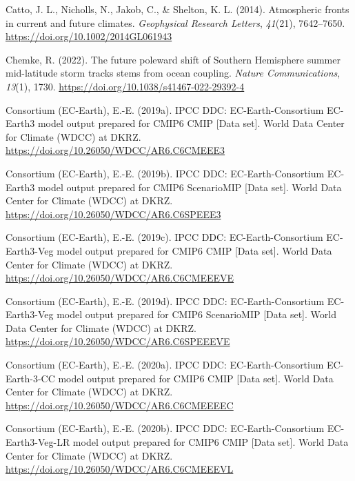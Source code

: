 \documentclass[
]{agujournal2019}
\newlength{\cslhangindent}
\newenvironment{CSLReferences}[2] %
 {\begin{list}{}{%
  \setlength{\itemindent}{0pt}
  \setlength{\leftmargin}{0pt}
  \setlength{\parsep}{0pt}
  \ifodd #1
   \setlength{\leftmargin}{\cslhangindent}
   \setlength{\itemindent}{-1\cslhangindent}
  \fi
  \setlength{\itemsep}{#2\baselineskip}}}
 {\end{list}}
\begin{document}
\begin{CSLReferences}{1}{0}
Catto, J. L., Nicholls, N., Jakob, C., \& Shelton, K. L. (2014).
Atmospheric fronts in current and future climates. \emph{Geophysical
Research Letters}, \emph{41}(21), 7642--7650.
\url{https://doi.org/10.1002/2014GL061943}

Chemke, R. (2022). The future poleward shift of {Southern Hemisphere}
summer mid-latitude storm tracks stems from ocean coupling. \emph{Nature
Communications}, \emph{13}(1), 1730.
\url{https://doi.org/10.1038/s41467-022-29392-4}

Consortium (EC-Earth), E.-E. (2019a). {IPCC DDC}: {EC-Earth-Consortium
EC-Earth3} model output prepared for {CMIP6 CMIP} {[}Data set{]}. World
Data Center for Climate (WDCC) at DKRZ.
\url{https://doi.org/10.26050/WDCC/AR6.C6CMEEE3}

Consortium (EC-Earth), E.-E. (2019b). {IPCC DDC}: {EC-Earth-Consortium
EC-Earth3} model output prepared for {CMIP6 ScenarioMIP} {[}Data set{]}.
World Data Center for Climate (WDCC) at DKRZ.
\url{https://doi.org/10.26050/WDCC/AR6.C6SPEEE3}

Consortium (EC-Earth), E.-E. (2019c). {IPCC DDC}: {EC-Earth-Consortium
EC-Earth3-Veg} model output prepared for {CMIP6 CMIP} {[}Data set{]}.
World Data Center for Climate (WDCC) at DKRZ.
\url{https://doi.org/10.26050/WDCC/AR6.C6CMEEEVE}

Consortium (EC-Earth), E.-E. (2019d). {IPCC DDC}: {EC-Earth-Consortium
EC-Earth3-Veg} model output prepared for {CMIP6 ScenarioMIP} {[}Data
set{]}. World Data Center for Climate (WDCC) at DKRZ.
\url{https://doi.org/10.26050/WDCC/AR6.C6SPEEEVE}

Consortium (EC-Earth), E.-E. (2020a). {IPCC DDC}: {EC-Earth-Consortium
EC-Earth-3-CC} model output prepared for {CMIP6 CMIP} {[}Data set{]}.
World Data Center for Climate (WDCC) at DKRZ.
\url{https://doi.org/10.26050/WDCC/AR6.C6CMEEEEC}

Consortium (EC-Earth), E.-E. (2020b). {IPCC DDC}: {EC-Earth-Consortium
EC-Earth3-Veg-LR} model output prepared for {CMIP6 CMIP} {[}Data set{]}.
World Data Center for Climate (WDCC) at DKRZ.
\url{https://doi.org/10.26050/WDCC/AR6.C6CMEEEVL}


\end{CSLReferences}
\end{document}
